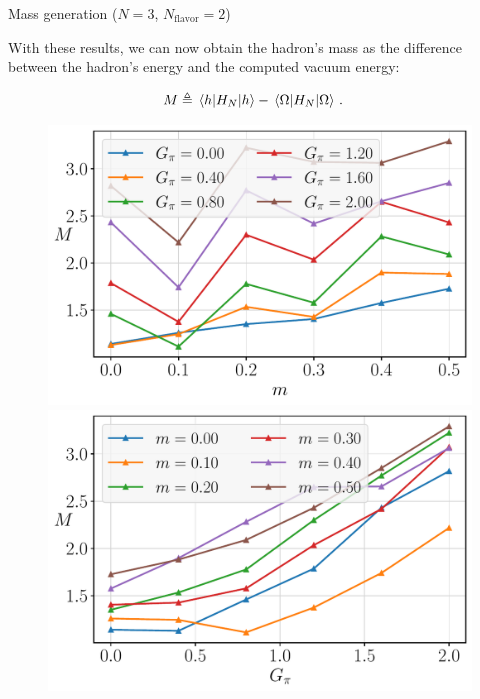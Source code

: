 
\begin{frame}[allowframebreaks]{Mass generation ($N=3$, $N_\text{flavor}=2$)}

  With these results, we can now obtain the hadron's mass as the difference between the hadron's energy and the computed vacuum energy:

  \begin{gather*}
    M \triangleq \mel{h}{H_N}{h} - \mel{\Omega}{H_N}{\Omega} \,.\quad
  \end{gather*}

  \begin{figure}[!p]
  	\centering
  	\begin{minipage}[c]{.40\linewidth}
  		\centering
  		\includegraphics[width=\linewidth]{Figures/chapter06/g-mass-curves}
  	\end{minipage}
    \hspace{.025\linewidth}
  	\begin{minipage}[c]{.40\linewidth}
  		\centering
  		\includegraphics[width=\linewidth]{Figures/chapter06/m-mass-curves}
  	\end{minipage}
  \end{figure}


\end{frame}
